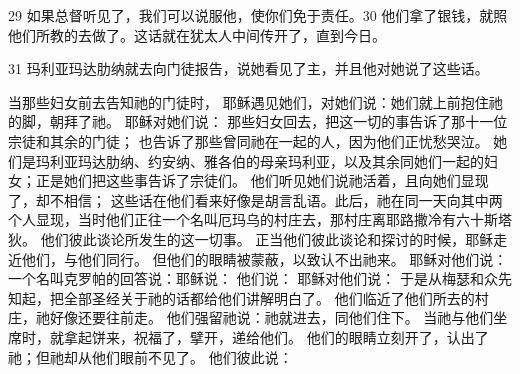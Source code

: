 29  如果总督听见了，我们可以说服他，使你们免于责任。30  他们拿了银钱，就照他们所教的去做了。这话就在犹太人中间传开了，直到今日。\par

31  玛利亚玛达肋纳就去向门徒报告，说她看见了主，并且他对她说了这些话。\par

 当那些妇女前去告知祂的门徒时， 耶稣遇见她们，对她们说：她们就上前抱住祂的脚，朝拜了祂。 耶稣对她们说： 那些妇女回去，把这一切的事告诉了那十一位宗徒和其余的门徒； 也告诉了那些曾同祂在一起的人，因为他们正忧愁哭泣。 她们是玛利亚玛达肋纳、约安纳、雅各伯的母亲玛利亚，以及其余同她们一起的妇女；正是她们把这些事告诉了宗徒们。 他们听见她们说祂活着，且向她们显现了，却不相信； 这些话在他们看来好像是胡言乱语。此后，祂在同一天向其中两个人显现，当时他们正往一个名叫厄玛乌的村庄去，那村庄离耶路撒冷有六十斯塔狄。 他们彼此谈论所发生的这一切事。 正当他们彼此谈论和探讨的时候，耶稣走近他们，与他们同行。 但他们的眼睛被蒙蔽，以致认不出祂来。 耶稣对他们说： 一个名叫克罗帕的回答说：耶稣说： 他们说： 耶稣对他们说： 于是从梅瑟和众先知起，把全部圣经关于祂的话都给他们讲解明白了。 他们临近了他们所去的村庄，祂好像还要往前走。 他们强留祂说：祂就进去，同他们住下。 当祂与他们坐席时，就拿起饼来，祝福了，擘开，递给他们。 他们的眼睛立刻开了，认出了祂；但祂却从他们眼前不见了。 他们彼此说：\par

